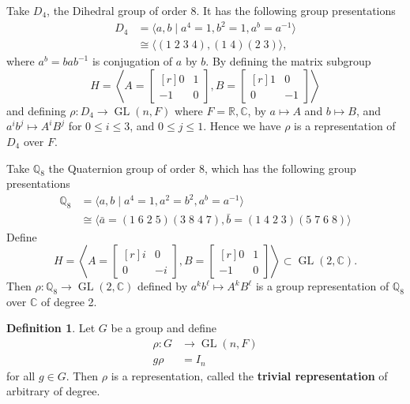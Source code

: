 \documentclass[11pt, notitlepage]{article}
\numberwithin{equation}{section}
\theoremstyle{plain}
\theoremstyle{definition}
\newtheorem{definition}[theorem]{Definition}
\newenvironment{example}
	{\pushQED{\qed}\renewcommand{\qedsymbol}{$\blacktriangleleft$}\examplex}
	{\popQED\endexamplex}
\newcommand{\R}{\mathbb{R}}
\newcommand{\C}{\mathbb{C}}
\newcommand{\Q}{\mathbb{Q}}
\DeclareMathOperator{\GL}{GL}
\begin{document}
\begin{example} 
Take $D_4$, the Dihedral group of order 8. It has the following group presentations
\begin{align*}
    D_4 &= \langle a,b \mid a^4 = 1, b^2 = 1, a^b = a^{-1} \rangle\\
    &\cong \langle (1 \; 2 \; 3 \; 4), (1 \; 4)(2 \; 3) \rangle,
\end{align*}
where $a^b = bab^{-1}$ is conjugation of $a$ by $b$. By defining the matrix subgroup
\[
    H = \left\langle A = \begin{bmatrix*}[r]
        0 & 1\\
        -1 & 0
    \end{bmatrix*}, B = \begin{bmatrix*}[r]
        1 & 0\\
        0 & -1
    \end{bmatrix*}\right\rangle
\]
and defining $\rho : D_4 \to \GL(n,F)$ where $F = \R, \C$, by $a \mapsto A$ and $b \mapsto B$, and
$a^ib^j \mapsto A^iB^j$ for $0 \le i \le 3$, and $0 \le j \le 1$. Hence we have $\rho$ is a representation of $D_4$ over $F$.
\end{example}

\begin{example}
Take $\Q_8$ the Quaternion group of order 8, which has the following group presentations
\begin{align*}
    \Q_8 &= \langle a,b \mid a^4 = 1, a^2 = b^2, a^b = a^{-1}\rangle\\
    &\cong \langle \bar a = (1 \; 6 \; 2 \; 5)(3 \; 8 \; 4 \; 7), \bar b = (1 \; 4 \; 2 \; 3)(5 \; 7 \; 6 \; 8)\rangle
\end{align*}
Define
\[
    H = \left\langle A = \begin{bmatrix*}[r]
        i & 0\\
        0 & -i
    \end{bmatrix*}, B = \begin{bmatrix*}[r]
        0 & 1\\
        -1 & 0
    \end{bmatrix*}\right\rangle \subset \GL(2,\C).
\]
Then $\rho : \Q_8 \to \GL(2,\C)$ defined by $a^kb^\ell \mapsto A^kB^\ell$ is a group representation of $\Q_8$ over $\C$ of degree 2.
\end{example}


\begin{definition}
Let $G$ be a group and define
\begin{align*}
    \rho : G &\to \GL(n,F)\\
    g\rho &= I_n
\end{align*}
for all $g \in G$. Then $\rho$ is a representation, called the \textbf{trivial representation} of arbitrary of degree.
\end{definition}
\end{document}
